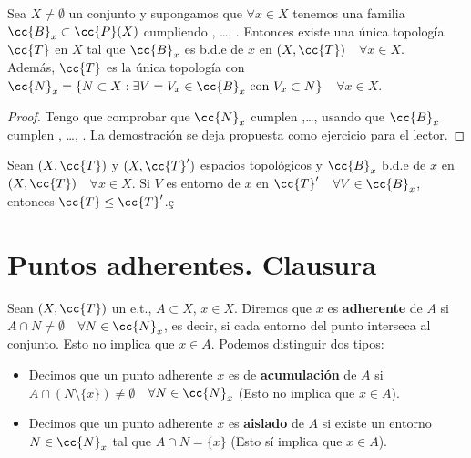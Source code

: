\begin{prop}
    Sea $X \neq \emptyset$ un conjunto y supongamos que $\forall x \in X$ tenemos una familia $\cc{B}_x \subset \cc{P}(X)$ cumpliendo , \dots, . Entonces existe una única topología $\cc{T}$ en $X$ tal que $\cc{B}_x$ es b.d.e de $x$ en $(X,\cc{T})$\ \ $\forall x \in X$.\\

    Además, $\cc{T}$ es la única topología con $\cc{N}_x=\{N\subset X : \exists V=V_x \in \cc{B}_x\text{ con }V_x\subset N\}$\ \ $\forall x \in X$.

    \begin{proof}
        Tengo que comprobar que $\cc{N}_x$ cumplen ,\dots,  usando que $\cc{B}_x$ cumplen , \dots, . La demostración se deja propuesta como ejercicio para el lector. %
    \end{proof}
\end{prop}

\begin{ejercicio}
    Sean $(X, \cc{T})$ y $(X, \cc{T}')$ espacios topológicos y $\cc{B}_x$ b.d.e de $x$ en $(X,\cc{T})$\ \ $\forall x \in X$. Si $V$ es entorno de $x$ en $\cc{T}'$\ \ $\forall V \in \cc{B}_x$, entonces $\cc{T} \leq \cc{T}'$.ç
    \endsquare
\end{ejercicio}

\section{Puntos adherentes. Clausura}

\begin{definicion}
    Sean $(X, \cc{T})$ un e.t., $A\subset X$, $x\in X$. Diremos que $x$ es \textbf{adherente} de $A$ si $A\cap N\neq\emptyset$\ \ $\forall N \in \cc{N}_x$, es decir, si cada entorno del punto interseca al conjunto. Esto no implica que $x\in A$. Podemos distinguir dos tipos:
    \begin{itemize}
        \item Decimos que un punto adherente $x$ es de \textbf{acumulación} de $A$ si $A\cap(N\setminus\{x\})\neq \emptyset$\ \ $\forall N \in \cc{N}_x$ (Esto no implica que $x\in A$).
        \item Decimos que un punto adherente $x$ es \textbf{aislado} de $A$ si existe un entorno $N\in \cc{N}_x$ tal que $A\cap N=\{x\}$ (Esto sí implica que $x\in A$).
    \end{itemize}
    \endsquare
\end{definicion}


